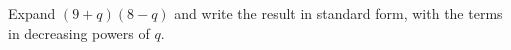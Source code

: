 Expand $(9+q)(8-q)$ and write the result in standard form, with the terms in decreasing powers of $q$.
